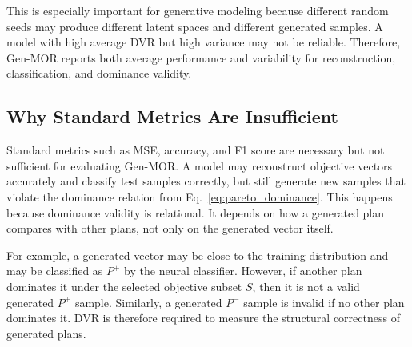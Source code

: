 This is especially important for generative modeling because different random seeds may produce different latent spaces and different generated samples. A model with high average DVR but high variance may not be reliable. Therefore, Gen-MOR reports both average performance and variability for reconstruction, classification, and dominance validity.

\subsection{Why Standard Metrics Are Insufficient}
\label{subsec:why_standard_metrics_insufficient}

Standard metrics such as MSE, accuracy, and F1 score are necessary but not sufficient for evaluating Gen-MOR. A model may reconstruct objective vectors accurately and classify test samples correctly, but still generate new samples that violate the dominance relation from Eq.~\eqref{eq:pareto_dominance}. This happens because dominance validity is relational. It depends on how a generated plan compares with other plans, not only on the generated vector itself.

For example, a generated vector may be close to the training distribution and may be classified as $P^{+}$ by the neural classifier. However, if another plan dominates it under the selected objective subset $S$, then it is not a valid generated $P^{+}$ sample. Similarly, a generated $P^{-}$ sample is invalid if no other plan dominates it. DVR is therefore required to measure the structural correctness of generated plans.